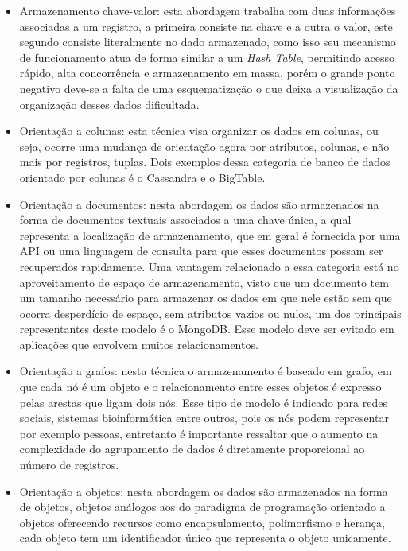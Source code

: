 \documentclass[12pt]{article}
\begin{document}
\begin{itemize}
\item Armazenamento chave-valor: esta abordagem trabalha com duas informações associadas a um registro, a primeira consiste na chave e a outra o valor, este segundo consiste literalmente no dado armazenado, como isso seu mecanismo de funcionamento atua de forma similar a um \textit{Hash Table}, permitindo acesso rápido, alta concorrência e armazenamento em massa, porém o grande ponto negativo deve-se a falta de uma esquematização o que deixa a visualização da organização desses dados dificultada.\cite{typeNOSQL:2013}\\

\item Orientação a colunas: esta técnica visa organizar os dados em colunas, ou seja, ocorre uma mudança de orientação agora por atributos, colunas, e não mais por registros, tuplas. Dois exemplos dessa categoria de banco de dados orientado por colunas é o Cassandra e o BigTable.\cite{brito2010bancos}\cite{surveyNosql:2012}\\

\item Orientação a documentos: nesta abordagem os dados são armazenados na forma de documentos textuais associados a uma chave única, a qual representa a localização de armazenamento, que em geral é fornecida por uma API ou uma linguagem de consulta para que esses documentos possam ser recuperados rapidamente. \cite{surveyNosql:2012} Uma vantagem relacionado a essa categoria está no aproveitamento de espaço de armazenamento, visto que um documento tem um tamanho necessário para armazenar os dados em que nele estão sem que ocorra desperdício de espaço, sem atributos vazios ou nulos, um dos principais representantes deste modelo é o MongoDB. Esse modelo deve ser evitado em aplicações que envolvem muitos relacionamentos.\cite{typeNOSQL:2013}\\

\item Orientação a grafos: nesta técnica o armazenamento é baseado em grafo, em que cada nó é um objeto e o relacionamento entre esses objetos é expresso pelas arestas que ligam dois nós. Esse tipo de modelo é indicado para redes sociais, sistemas bioinformática entre outros, pois os nós podem representar por exemplo pessoas, entretanto é importante ressaltar que o aumento na complexidade do agrupamento de dados é diretamente proporcional ao número de registros.\cite{typeNOSQL:2013}\cite{surveyNosql:2012} \\

\item Orientação a objetos: nesta abordagem os dados são armazenados na forma de objetos, objetos análogos aos do paradigma de programação orientado a objetos oferecendo recursos como encapsulamento, polimorfismo e herança, cada objeto tem um identificador único que representa o objeto unicamente.\cite{typeNOSQL:2013}\\

\end{itemize}
\end{document}
